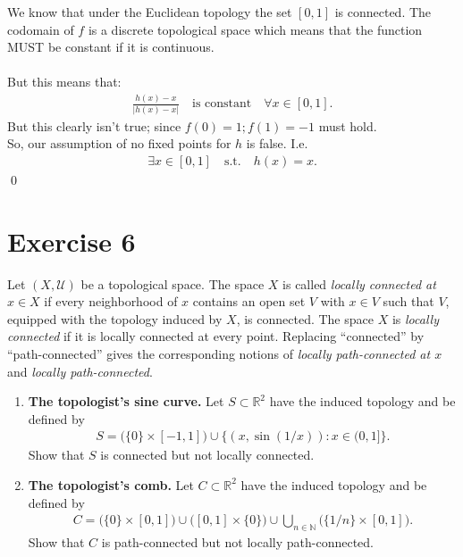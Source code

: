 \documentclass[12pt]{article}
\begin{document}
We know that under the Euclidean topology the set $[0, 1]$ is connected.
The codomain of $f$ is a discrete topological space which means that the function MUST be constant if it is continuous.\\
\\
But this means that:
\begin{align*}
\frac{h(x)-x}{|h(x)-x|}\quad\text{is constant}\quad\forall x\in[0,1].
\end{align*}
But this clearly isn't true; since $f(0)=1; f(1)=-1$ must hold.\\
So, our assumption of no fixed points for $h$ is false. I.e.
\begin{align*}
\exists x\in[0,1]\quad\text{s.t.}\quad h(x)=x.
\end{align*}
\qed

\newpage
\section*{Exercise 6}
Let $(X,\mathcal{U})$ be a topological space. The space $X$ is called \textit{locally connected at $x\in X$} if every neighborhood of $x$ contains an open set $V$ with $x\in V$ such that $V$, equipped with the topology induced by $X$, is connected. The space $X$ is \textit{locally connected} if it is locally connected at every point. Replacing ``connected'' by ``path-connected'' gives the corresponding notions of \textit{locally path-connected at $x$} and \textit{locally path-connected}.
\begin{enumerate}
\item[a)] \textbf{The topologist's sine curve.} Let $S\subset\mathbb{R}^2$ have the induced topology and be defined by
\begin{align*}
S=\bigl(\{0\}\times[-1,1]\bigr)
\cup\{(x,\sin(1/x)):x\in(0,1]\}.
\end{align*}
Show that $S$ is connected but not locally connected.
\item[b)] \textbf{The topologist's comb.} Let $C\subset\mathbb{R}^2$ have the induced topology and be defined by
\begin{align*}
C=\bigl(\{0\}\times[0,1]\bigr)
\cup\bigl([0,1]\times\{0\}\bigr)
\cup\bigcup_{n\in\mathbb{N}}\bigl(\{1/n\}\times[0,1]\bigr).
\end{align*}
Show that $C$ is path-connected but not locally path-connected.
\end{enumerate}
\end{document}
